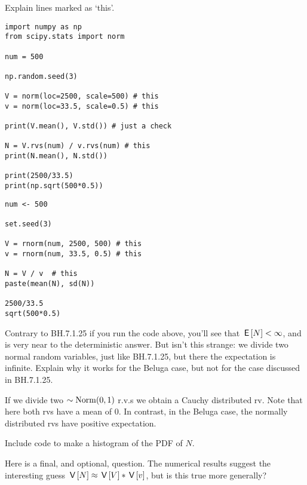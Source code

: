 \begin{exercise}
Explain lines marked as `this'.

\begin{verbatim}
import numpy as np
from scipy.stats import norm

num = 500

np.random.seed(3)

V = norm(loc=2500, scale=500) # this
v = norm(loc=33.5, scale=0.5) # this

print(V.mean(), V.std()) # just a check

N = V.rvs(num) / v.rvs(num) # this
print(N.mean(), N.std())

print(2500/33.5)
print(np.sqrt(500*0.5))
\end{verbatim}

\begin{verbatim}
num <- 500

set.seed(3)

V = rnorm(num, 2500, 500) # this
v = rnorm(num, 33.5, 0.5) # this

N = V / v  # this
paste(mean(N), sd(N))

2500/33.5
sqrt(500*0.5)
\end{verbatim}
\end{exercise}


\begin{exercise}
Contrary to BH.7.1.25 if you run the code above, you'll see that $\,\mathsf{E}\left[N\right] < \infty$, and is very near to the deterministic answer.
But isn't this strange: we divide two normal random variables, just like BH.7.1.25, but there the expectation is infinite.
Explain why it works for the Beluga case, but not for the case discussed in BH.7.1.25.
\begin{solution}
If we divide two $\sim \mathrm{Norm}(0,1)$ r.v.s we obtain a Cauchy distributed rv.
Note that here both rvs have a mean of $0$.
In contrast, in the Beluga case, the normally distributed rvs have positive expectation.
\end{solution}
\end{exercise}

\begin{exercise}
Include code to make a histogram of the PDF of $N$.
\end{exercise}



\begin{remark}
Here is a final, and optional, question. The numerical results suggest the interesting guess $\,\mathsf{V}\left[N\right] \approx \,\mathsf{V}\left[V\right] * \,\mathsf{V}\left[v\right]$, but is this true more generally?
\end{remark}

